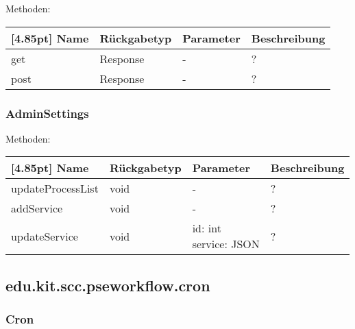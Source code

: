 		Methoden:
		\begin{center}
		    \setlength\tabcolsep{5pt}
        	\renewcommand{\arraystretch}{1.5}
            	\begin{tabularx}{\textwidth}{|l|l|l|X|}
            	\hline
            	\rowcolor[gray]{0.75}[4.85pt]
        		Name & Rückgabetyp & Parameter & Beschreibung \\ \hline 
                get & Response & - & ? \\ \hline
                post & Response & - & ? \\ \hline
            	\end{tabularx}
		\end{center}
		
		\subsubsection{AdminSettings}
		
		Methoden:
		\begin{center}
		    \setlength\tabcolsep{5pt}
        	\renewcommand{\arraystretch}{1.5}
            	\begin{tabularx}{\textwidth}{|l|l|l|X|}
            	\hline
            	\rowcolor[gray]{0.75}[4.85pt]
        		Name & Rückgabetyp & Parameter & Beschreibung \\ \hline 
                updateProcessList & void & - & ? \\ \hline
                addService & void & - & ? \\ \hline
                updateService & void & \thead{id: int\\service: JSON} & ? \\ \hline
            	\end{tabularx}
		\end{center}

    \subsection{edu.kit.scc.pseworkflow.cron}

		\subsubsection{Cron}

